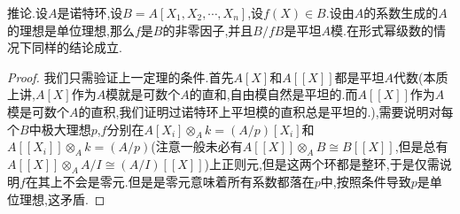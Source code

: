 推论.设$A$是诺特环,设$B=A[X_1,X_2,\cdots,X_n]$,设$f(X)\in B$.设由$A$的系数生成的$A$的理想是单位理想,那么$f$是$B$的非零因子,并且$B/fB$是平坦$A$模.在形式幂级数的情况下同样的结论成立.
\begin{proof}
	
	我们只需验证上一定理的条件.首先$A[X]$和$A[[X]]$都是平坦$A$代数(本质上讲,$A[X]$作为$A$模就是可数个$A$的直和,自由模自然是平坦的.而$A[[X]]$作为$A$模是可数个$A$的直积,我们证明过诺特环上平坦模的直积总是平坦的.),需要说明对每个$B$中极大理想$p$,$f$分别在$A[X_i]\otimes_Ak=(A/p)[X_i]$和$A[[X_i]]\otimes_Ak=(A/p)$(注意一般未必有$A[[X]]\otimes_AB\cong B[[X]]$,但是总有$A[[X]]\otimes_AA/I\cong (A/I)[[X]]$)上正则元,但是这两个环都是整环,于是仅需说明$f$在其上不会是零元.但是是零元意味着所有系数都落在$p$中,按照条件导致$p$是单位理想,这矛盾.
\end{proof}

